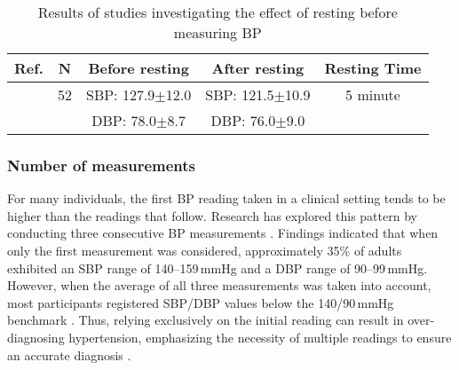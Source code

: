 \documentclass[journal,article,moreauthors]{Definitions/mdpi}
\begin{document}
\begin{table}[tb]
\caption{Results of studies investigating the effect of resting before measuring BP}\label{Tab: rest}
\begin{center}
\begin{tabular}{rcccc}
\toprule
\textbf{Ref.} & \textbf{N} & \textbf{Before resting} & \textbf{After resting} & \textbf{Resting Time}\\
\hline
\citep{Boivin2014-ss} & 52 & SBP: 127.9$\pm$12.0 & SBP: 121.5$\pm$10.9 & 5 minute\\ & & DBP: 78.0$\pm$8.7 & DBP: 76.0$\pm$9.0 & 
\\
\bottomrule
\end{tabular}
\end{center}
\end{table}

\subsubsection{Number of measurements}
For many individuals, the first BP reading taken in a clinical setting tends to be higher than the readings that follow. Research has explored this pattern by conducting three consecutive BP measurements \citep{muntner2019measurement}. Findings indicated that when only the first measurement was considered, approximately 35\% of adults exhibited an SBP range of 140--159\,mmHg and a DBP range of 90--99\,mmHg. However, when the average of all three measurements was taken into account, most participants registered SBP/DBP values below the 140/90\,mmHg benchmark \citep{muntner2019measurement}. Thus, relying exclusively on the initial reading can result in over-diagnosing hypertension, emphasizing the necessity of multiple readings to ensure an accurate diagnosis \citep{MANCIA1983}.
\end{document}
